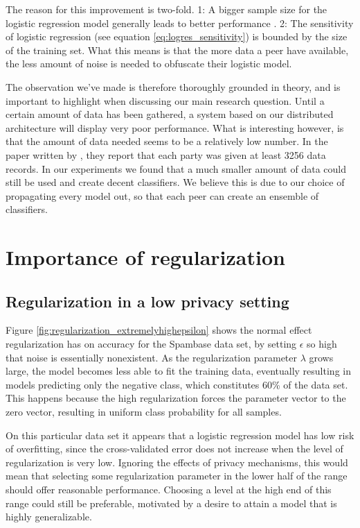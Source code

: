 The reason for this improvement is two-fold. 1: A bigger sample size for the logistic regression model generally leads to better performance \cite{peduzzi1996simulation}. 2: The sensitivity of logistic regression (see equation \ref{eq:logres_sensitivity}) is bounded by the size of the training set. What this means is that the more data a peer have available, the less amount of noise is needed to obfuscate their logistic model. 

The observation we've made is therefore thoroughly grounded in theory, and is important to highlight when discussing our main research question. Until a certain amount of data has been gathered, a system based on our distributed architecture will display very poor performance. What is interesting however, is that the amount of data needed seems to be a relatively low number. In the paper written by \cite{pathak2010diffprivhomo}, they report that each party was given at least 3256 data records. In our experiments we found that a much smaller amount of data could still be used and create decent classifiers. We believe this is due to our choice of propagating every model out, so that each peer can create an ensemble of classifiers. 

\section{Importance of regularization}

\subsection{Regularization in a low privacy setting}
Figure \ref{fig:regularization_extremelyhighepsilon} shows the normal effect regularization has on accuracy for the Spambase data set, by setting $\epsilon$ so high that noise is essentially nonexistent. As the regularization parameter $\lambda$ grows large, the model becomes less able to fit the training data, eventually resulting in models predicting only the negative class, which constitutes 60\% of the data set. This happens because the high regularization forces the parameter vector to the zero vector, resulting in uniform class probability for all samples. 

On this particular data set it appears that a logistic regression model has low risk of overfitting, since the cross-validated error does not increase when the level of regularization is very low. Ignoring the effects of privacy mechanisms, this would mean that selecting some regularization parameter in the lower half of the range should offer reasonable performance. Choosing a level at the high end of this range could still be preferable, motivated by a desire to attain a model that is highly generalizable.

